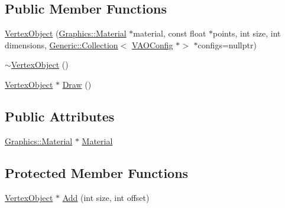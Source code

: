 \subsection*{Public Member Functions}
\begin{DoxyCompactItemize}
\item 
\mbox{\hyperlink{classEngine_1_1Components_1_1Objects_1_1VertexObject_a2cd67c7ea4baefd945c5045d2a775a5d}{Vertex\+Object}} (\mbox{\hyperlink{classEngine_1_1Components_1_1Graphics_1_1Material}{Graphics\+::\+Material}} $\ast$material, const float $\ast$points, int size, int dimensions, \mbox{\hyperlink{classGeneric_1_1Collection}{Generic\+::\+Collection}}$<$ \mbox{\hyperlink{structEngine_1_1Components_1_1Objects_1_1VAOConfig}{V\+A\+O\+Config}} $\ast$$>$ $\ast$configs=nullptr)
\item 
\mbox{\hyperlink{classEngine_1_1Components_1_1Objects_1_1VertexObject_a90ab6da3110fffb6343790de9ba5b0de}{$\sim$\+Vertex\+Object}} ()
\item 
\mbox{\hyperlink{classEngine_1_1Components_1_1Objects_1_1VertexObject}{Vertex\+Object}} $\ast$ \mbox{\hyperlink{classEngine_1_1Components_1_1Objects_1_1VertexObject_a53a8f546ee082720579e2c33be6cedec}{Draw}} ()
\end{DoxyCompactItemize}
\subsection*{Public Attributes}
\begin{DoxyCompactItemize}
\item 
\mbox{\hyperlink{classEngine_1_1Components_1_1Graphics_1_1Material}{Graphics\+::\+Material}} $\ast$ \mbox{\hyperlink{classEngine_1_1Components_1_1Objects_1_1VertexObject_a86c1fced4cdc5e59a66a635390a17eca}{Material}}
\end{DoxyCompactItemize}
\subsection*{Protected Member Functions}
\begin{DoxyCompactItemize}
\item 
\mbox{\hyperlink{classEngine_1_1Components_1_1Objects_1_1VertexObject}{Vertex\+Object}} $\ast$ \mbox{\hyperlink{classEngine_1_1Components_1_1Objects_1_1VertexObject_a18550cae56ca1066792528a7dcf5d28a}{Add}} (int size, int offset)
\end{DoxyCompactItemize}
